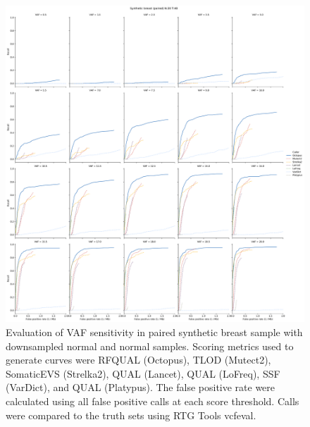 \documentclass{article}
\begin{document}
\begin{figure}[ht!]
    \centering
    \includegraphics[width=\textwidth]{figures/paired_somatic_breast_n20_t40_vaf_recall.pdf}
    \caption{Evaluation of VAF sensitivity in paired synthetic breast sample with downsampled normal and normal samples. Scoring metrics used to generate curves were RFQUAL (Octopus), TLOD (Mutect2), SomaticEVS (Strelka2), QUAL (Lancet), QUAL (LoFreq), SSF (VarDict), and QUAL (Platypus). The false positive rate were calculated using all false positive calls at each score threshold. Calls were compared to the truth sets using RTG Tools vcfeval.}
    \label{supfig:paired-somatic-breast-n20-t40-vaf}
\end{figure}

\clearpage
\end{document}
